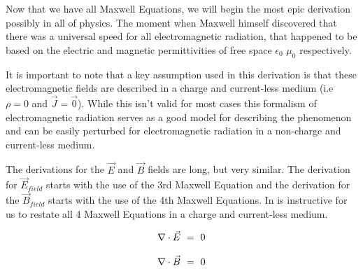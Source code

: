 \documentclass{article}
\newcounter{subsubsubsection}[subsubsection]
\begin{document}
Now that we have all Maxwell Equations, we will begin the most epic derivation possibly in all of physics. The moment when Maxwell himself discovered that there was a universal speed for all electromagnetic radiation, that happened to be based on the electric and magnetic permittivities of free space \begin{math} \epsilon_{0} \end{math} \begin{math} \mu_{0} \end{math} respectively. 

It is important to note that a key assumption used in this derivation is that these electromagnetic fields are described in a charge and current-less medium (i.e \begin{math} \rho = 0 \end{math} and \begin{math} \vec{J} = \vec{0} \end{math}). While this isn't valid for most cases this formalism of electromagnetic radiation serves as a good model for describing the phenomenon and can be easily perturbed for electromagnetic radiation in a non-charge and current-less medium. 

The derivations for the \begin{math} \vec{E} \end{math} and \begin{math} \vec{B} \end{math} fields are long, but very similar. The derivation for \begin{math} \vec{E}_{field} \end{math} starts with the use of the 3rd Maxwell Equation and the derivation for the \begin{math} \vec{B}_{field} \end{math} starts with the use of the 4th Maxwell Equations. In is instructive for us to restate all 4 Maxwell Equations in a charge and current-less medium. 

\begin{equation} \label{eb-eq-1000-1}
\nabla\cdot\vec{E} \hspace{0.125cm} = \hspace{0.125cm} 0 
\end{equation}

\begin{equation} \label{eb-eq-1001-1}
\nabla\cdot\vec{B} \hspace{0.125cm} = \hspace{0.125cm} 0
\end{equation}
\end{document}
